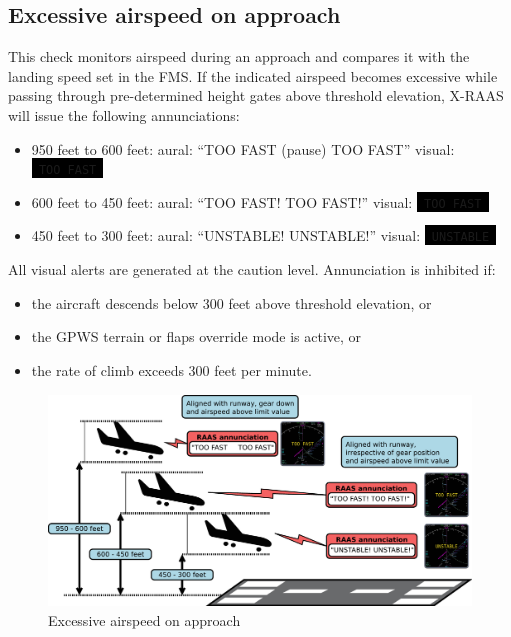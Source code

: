 \documentclass[a4paper,12pt]{article}
\newcommand{\visualadvisory}[3][b]{%
    \ifthenelse{\equal{#1}{b}}{\begin{center}}{}
    \noindent
    \colorbox{black}{\textcolor{#2visualadvisorycolor}{\large\texttt{~#3~}}}
    \ifthenelse{\equal{#1}{b}}{\end{center}}{}}
\begin{document}
\subsection{Excessive airspeed on approach}
\label{subsec:TooFastMon}

This check monitors airspeed during an approach and compares it with the
landing speed set in the FMS. If the indicated airspeed becomes excessive
while passing through pre-determined height gates above threshold
elevation, X-RAAS will issue the following annunciations:

\begin{itemize}

\item 950 feet to 600 feet: aural: ``TOO FAST (pause) TOO FAST''
visual:\visualadvisory[i]{nonroutine}{TOO FAST}

\item 600 feet to 450 feet: aural: ``TOO FAST! TOO FAST!''
visual:\visualadvisory[i]{nonroutine}{TOO FAST}

\item 450 feet to 300 feet: aural: ``UNSTABLE! UNSTABLE!''
visual:\visualadvisory[i]{nonroutine}{UNSTABLE}

\end{itemize}

\noindent All visual alerts are generated at the caution level.
Annunciation is inhibited if:

\begin{itemize}

\item the aircraft descends below 300 feet above threshold elevation, or

\item the GPWS terrain or flaps override mode is active, or

\item the rate of climb exceeds 300 feet per minute.

\end{itemize}

\begin{figure}[H]
\begin{center}
\includegraphics[width=\textwidth]{../src/apch_too_fast.pdf}
\end{center}
\caption{Excessive airspeed on approach}
\end{figure}
\end{document}
